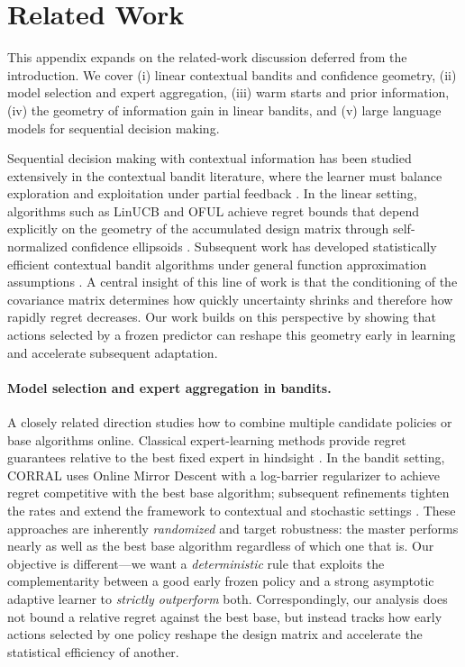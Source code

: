 \documentclass{article}
\theoremstyle{definition}
\theoremstyle{remark}
\theoremstyle{remark}
\begin{document}
\appendix

\section{Related Work}\label{sec:related}
This appendix expands on the related-work discussion deferred from the
introduction. We cover (i) linear contextual bandits and confidence geometry,
(ii) model selection and expert aggregation, (iii) warm starts and prior
information, (iv) the geometry of information gain in linear bandits, and
(v) large language models for sequential decision making.

Sequential decision making with contextual information has been studied
extensively in the contextual bandit literature, where the learner must
balance exploration and exploitation under partial feedback
\cite{langford2007epoch,agarwal2014taming,foster2021statistical,
lattimore2020bandit}. In the linear setting, algorithms such as LinUCB and
OFUL achieve regret bounds that depend explicitly on the geometry of the
accumulated design matrix through self-normalized confidence ellipsoids
\cite{chu2011contextual,abbasi2011improved}. Subsequent work has developed
statistically efficient contextual bandit algorithms under general function
approximation assumptions \cite{agarwal2012contextual,foster2018practical,
foster2020beyond,simchi2022bypassing,zhu2022contextual,rucker2023infinite,
zhang2024efficient}. A central insight of this line of work is that the
conditioning of the covariance matrix determines how quickly uncertainty
shrinks and therefore how rapidly regret decreases. Our work builds on this
perspective by showing that actions selected by a frozen predictor can
reshape this geometry early in learning and accelerate subsequent adaptation.

\paragraph{Model selection and expert aggregation in bandits.}
A closely related direction studies how to combine multiple candidate
policies or base algorithms online. Classical expert-learning methods provide
regret guarantees relative to the best fixed expert in hindsight
\cite{auer2002nonstochastic}. In the bandit setting, CORRAL
\cite{agarwal2017corralling} uses Online Mirror Descent with a log-barrier
regularizer to achieve regret competitive with the best base algorithm;
subsequent refinements tighten the rates and extend the framework to
contextual and stochastic settings
\cite{pacchiano2020model,marinov2021pareto,zhu2022pareto,zhu2022near,
dann2024data}. These approaches are inherently \emph{randomized} and target
robustness: the master performs nearly as well as the best base algorithm
regardless of which one that is. Our objective is different---we want a
\emph{deterministic} rule that exploits the complementarity between a good
early frozen policy and a strong asymptotic adaptive learner to
\emph{strictly outperform} both. Correspondingly, our analysis does not
bound a relative regret against the best base, but instead tracks how early
actions selected by one policy reshape the design matrix and accelerate the
statistical efficiency of another.
\end{document}
